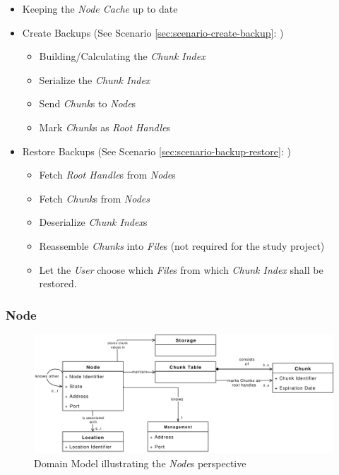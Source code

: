 \begin{itemize}
    \item Keeping the \emph{Node Cache} up to date
    \item Create Backups (See Scenario \ref{sec:scenario-create-backup}: )
    \begin{itemize}
        \item Building/Calculating the \emph{Chunk Index}
        \item Serialize the \emph{Chunk Index}
        \item Send \emph{Chunk}s to \emph{Node}s
        \item Mark \emph{Chunk}s as \emph{Root Handle}s
    \end{itemize}
    \item Restore Backups (See Scenario \ref{sec:scenario-backup-restore}: )
    \begin{itemize}
        \item Fetch \emph{Root Handle}s from \emph{Node}s
        \item Fetch \emph{Chunk}s from \emph{Nodes}
        \item Deserialize \emph{Chunk Index}s
        \item Reassemble \emph{Chunks} into \emph{File}s (not required for the study project)
        \item Let the \emph{User} choose which \emph{File}s from which \emph{Chunk Index} shall be restored.
    \end{itemize}
\end{itemize}

\subsubsection{Node}

\begin{figure}[h]
    \centering
    \includegraphics[width=1\linewidth]{resources/node_domain_model}
    \caption[Node Domain Model]{Domain Model illustrating the \emph{Node}s perspective}
\end{figure}

